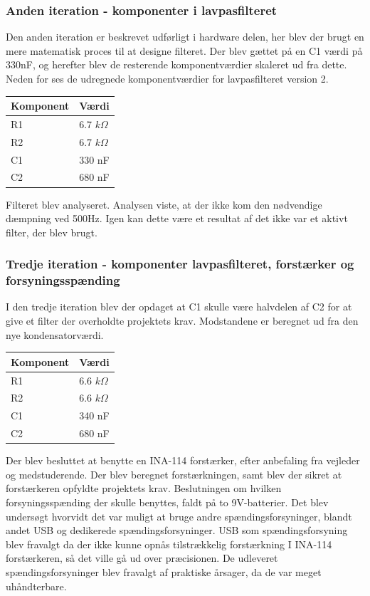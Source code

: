 \subsubsection{Anden iteration - komponenter i lavpasfilteret}
Den anden iteration er beskrevet udførligt i hardware delen, her blev der brugt en mere matematisk proces til at designe filteret. Der blev gættet på en C1 værdi på 330nF, og herefter blev de resterende komponentværdier skaleret ud fra dette. Neden for ses de udregnede komponentværdier for lavpasfilteret version 2.
\begin{table}[H]
\begin{tabular}{| l | l |}
   \hline
   Komponent & Værdi\\ \hline
   R1 & 6.7 $k\Omega$ \\ \hline
   R2 & 6.7 $k\Omega$ \\ \hline
   C1 & 330 nF\\\hline
   C2 & 680 nF\\\hline
\end{tabular}
\end{table}
Filteret blev analyseret. Analysen viste, at der ikke kom den nødvendige dæmpning ved 500Hz. Igen kan dette være et resultat af det ikke var et aktivt filter, der blev brugt. 
\subsubsection{Tredje iteration - komponenter lavpasfilteret, forstærker og forsyningsspænding}
I den tredje iteration blev der opdaget at C1 skulle være halvdelen af C2 for at give et filter der overholdte projektets krav. Modstandene er beregnet ud fra den nye kondensatorværdi.
\begin{table}[H]
\begin{tabular}{| l | l |}
   \hline
   Komponent & Værdi\\ \hline
   R1 & 6.6 $k\Omega$ \\ \hline
   R2 & 6.6 $k\Omega$ \\ \hline
   C1 & 340 nF\\\hline
   C2 & 680 nF\\\hline
\end{tabular}
\end{table}
Der blev besluttet at benytte en INA-114 forstærker, efter anbefaling fra vejleder og medstuderende. Der blev beregnet forstærkningen, samt blev der sikret at forstærkeren opfyldte projektets krav. Beslutningen om hvilken forsyningsspænding der skulle benyttes, faldt på to 9V-batterier. Det blev undersøgt hvorvidt det var muligt at bruge andre spændingsforsyninger, blandt andet USB og dedikerede spændingsforsyninger. USB som spændingsforsyning blev fravalgt da der ikke kunne opnås tilstrækkelig forstærkning I INA-114 forstærkeren, så det ville gå ud over præcisionen. De udleveret spændingsforsyninger blev fravalgt af praktiske årsager, da de var meget uhåndterbare.
